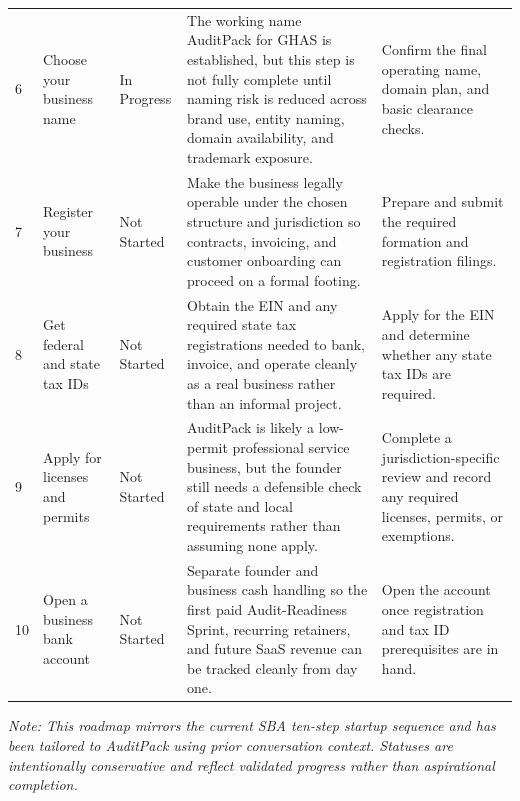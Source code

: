 \documentclass[10pt]{article}
\newcommand{\statusprogress}{\colorbox{ProgBg}{\textcolor{ProgFg}{\strut\hspace{0.35em}In Progress\hspace{0.35em}}}}
\newcommand{\statusnot}{\colorbox{NotBg}{\textcolor{NotFg}{\strut\hspace{0.35em}Not Started\hspace{0.35em}}}}
\begin{document}
\begin{longtable}{@{}L{0.045\textwidth}L{0.155\textwidth}L{0.125\textwidth}L{0.395\textwidth}L{0.18\textwidth}@{}}
6 & Choose your business name & \statusprogress & The working name AuditPack for GHAS is established, but this step is not fully complete until naming risk is reduced across brand use, entity naming, domain availability, and trademark exposure. & Confirm the final operating name, domain plan, and basic clearance checks. \\

7 & Register your business & \statusnot & Make the business legally operable under the chosen structure and jurisdiction so contracts, invoicing, and customer onboarding can proceed on a formal footing. & Prepare and submit the required formation and registration filings. \\

8 & Get federal and state tax IDs & \statusnot & Obtain the EIN and any required state tax registrations needed to bank, invoice, and operate cleanly as a real business rather than an informal project. & Apply for the EIN and determine whether any state tax IDs are required. \\

9 & Apply for licenses and permits & \statusnot & AuditPack is likely a low-permit professional service business, but the founder still needs a defensible check of state and local requirements rather than assuming none apply. & Complete a jurisdiction-specific review and record any required licenses, permits, or exemptions. \\

10 & Open a business bank account & \statusnot & Separate founder and business cash handling so the first paid Audit-Readiness Sprint, recurring retainers, and future SaaS revenue can be tracked cleanly from day one. & Open the account once registration and tax ID prerequisites are in hand. \\
\bottomrule
\end{longtable}
\endgroup

\vspace{0.2em}
{\footnotesize\textit{Note: This roadmap mirrors the current SBA ten-step startup sequence and has been tailored to AuditPack using prior conversation context. Statuses are intentionally conservative and reflect validated progress rather than aspirational completion.}}
\end{document}
